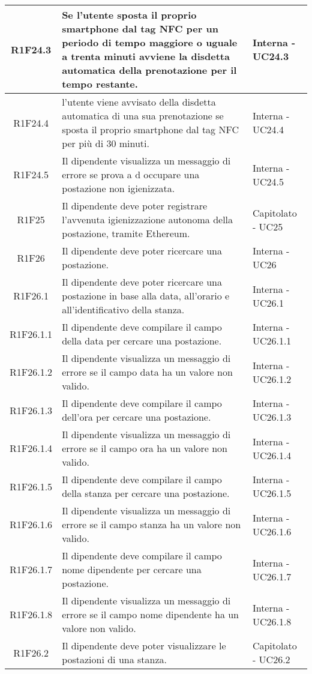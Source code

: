 \begin{center}
\begin{longtable}{|c|p{10cm}|p{4cm}|}
		\hline
		R1F24.3&Se l'utente sposta il proprio smartphone dal tag NFC per un periodo di tempo maggiore o uguale a trenta minuti avviene la disdetta automatica della prenotazione per il tempo restante.	&Interna - UC24.3 	\\
		\hline
		R1F24.4&l’utente viene avvisato della disdetta automatica di una sua prenotazione se sposta il proprio smartphone dal tag NFC per più di 30 minuti.	&Interna - UC24.4 	\\
		\hline
		R1F24.5&Il dipendente visualizza un messaggio di errore se prova a d occupare una postazione non igienizzata. &Interna - UC24.5 	\\
		\hline	
		R1F25&Il dipendente deve poter registrare l'avvenuta igienizzazione autonoma della postazione, tramite Ethereum.	&Capitolato - UC25	\\
		\hline	
			R1F26&Il dipendente deve poter ricercare una postazione.	&Interna - UC26	\\
		\hline
		R1F26.1&Il dipendente deve poter ricercare una postazione in base alla data, all'orario e all'identificativo della stanza.	&Interna - UC26.1	\\
		\hline
			R1F26.1.1&Il dipendente deve compilare il campo della data per cercare una postazione.	&Interna - UC26.1.1	\\
		\hline
			R1F26.1.2&Il dipendente visualizza un messaggio di errore se il campo data ha un valore non valido.	&Interna - UC26.1.2	\\
		\hline
			R1F26.1.3&Il dipendente deve compilare il campo dell'ora per cercare una postazione.	&Interna - UC26.1.3	\\
		\hline
			R1F26.1.4&Il dipendente visualizza un messaggio di errore se il campo ora ha un valore non valido.	&Interna - UC26.1.4	\\
		\hline
			R1F26.1.5&Il dipendente deve compilare il campo della stanza per cercare una postazione.		&Interna - UC26.1.5	\\
		\hline
			R1F26.1.6&Il dipendente visualizza un messaggio di errore se il campo stanza ha un valore non valido.	&Interna - UC26.1.6	\\
		\hline
			R1F26.1.7&Il dipendente deve compilare il campo nome dipendente per cercare una postazione.	&Interna - UC26.1.7	\\
		\hline
			R1F26.1.8&Il dipendente visualizza un messaggio di errore se il campo nome dipendente ha un valore non valido.	&Interna - UC26.1.8	\\
		\hline
		R1F26.2&Il dipendente deve poter visualizzare le postazioni di una stanza.	&Capitolato - UC26.2	\\

\end{longtable}
\end{center}
